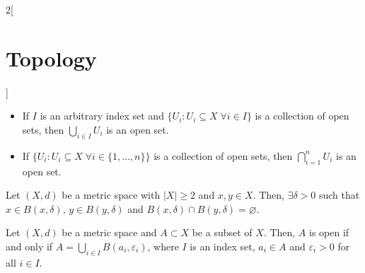 \documentclass[../../../main.tex]{subfiles}
\begin{document}
\begin{multicols}{2}[\section{Topology}]
\begin{prop}
\begin{itemize}
      \item If $I$ is an arbitrary index set and $\{U_i:U_i\subseteq X\;\forall i\in I\}$ is a collection of open sets, then $\bigcup_{i\in I}U_i$ is an open set.
      \item If $\{U_i:U_i\subseteq X\;\forall i\in \{1,\ldots,n\}\}$ is a collection of open sets, then $\bigcap_{i=1}^nU_i$ is an open set.
    \end{itemize}
  \end{prop}
  \begin{prop}
    Let $(X,d)$ be a metric space with $|X|\geq 2$ and $x,y\in X$. Then, $\exists\delta>0$ such that $x\in B(x,\delta)$, $y\in B(y,\delta)$ and $B(x,\delta)\cap B(y,\delta)=\varnothing$.
  \end{prop}
  \begin{prop}
    Let $(X,d)$ be a metric space and $A\subset X$ be a subset of $X$. Then, $A$ is open if and only if $A=\bigcup_{i\in I}B(a_i,\varepsilon_i)$, where $I$ is an index set, $a_i\in A$ and $\varepsilon_i>0$ for all $i\in I$.
  \end{prop}

\end{multicols}
\end{document}
